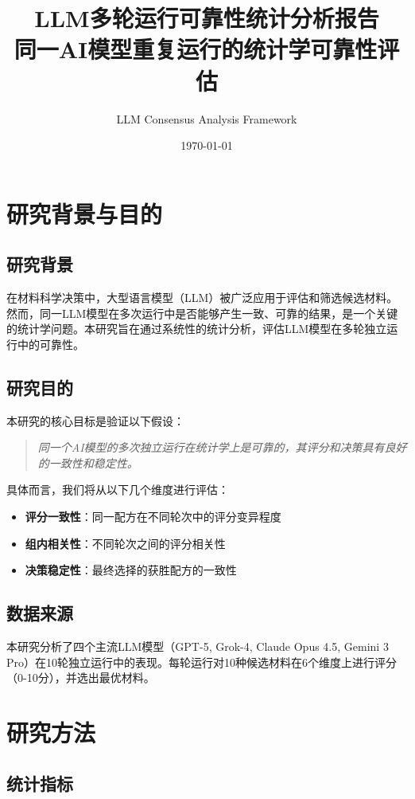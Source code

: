 \documentclass[12pt,a4paper]{article}
\title{\textbf{LLM多轮运行可靠性统计分析报告}\\
\large 同一AI模型重复运行的统计学可靠性评估}
\author{LLM Consensus Analysis Framework}
\date{\today}
\begin{document}
\maketitle

\tableofcontents
\newpage


\section{研究背景与目的}

\subsection{研究背景}
在材料科学决策中，大型语言模型（LLM）被广泛应用于评估和筛选候选材料。然而，同一LLM模型在多次运行中是否能够产生一致、可靠的结果，是一个关键的统计学问题。本研究旨在通过系统性的统计分析，评估LLM模型在多轮独立运行中的可靠性。

\subsection{研究目的}
本研究的核心目标是验证以下假设：
\begin{quote}
\textit{同一个AI模型的多次独立运行在统计学上是可靠的，其评分和决策具有良好的一致性和稳定性。}
\end{quote}

具体而言，我们将从以下几个维度进行评估：
\begin{itemize}
    \item \textbf{评分一致性}：同一配方在不同轮次中的评分变异程度
    \item \textbf{组内相关性}：不同轮次之间的评分相关性
    \item \textbf{决策稳定性}：最终选择的获胜配方的一致性
\end{itemize}

\subsection{数据来源}
本研究分析了四个主流LLM模型（GPT-5, Grok-4, Claude Opus 4.5, Gemini 3 Pro）在10轮独立运行中的表现。每轮运行对10种候选材料在6个维度上进行评分（0-10分），并选出最优材料。

\newpage


\section{研究方法}

\subsection{统计指标}
\end{document}
